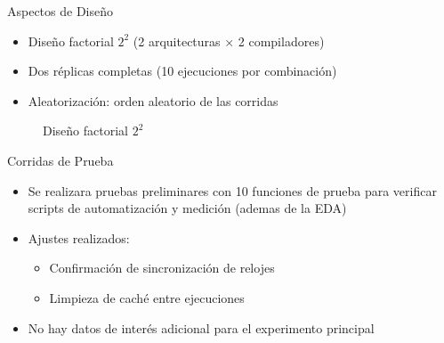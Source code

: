 \documentclass[aspectratio=169]{beamer}
\begin{document}
\begin{frame}{Aspectos de Diseño}
    \begin{itemize}
        \item Diseño factorial $2^2$ (2 arquitecturas × 2 compiladores)
        \item Dos réplicas completas (10 ejecuciones por combinación)
        \item Aleatorización: orden aleatorio de las corridas
    \end{itemize}
    
    \begin{figure}
        \centering
        \caption{Diseño factorial $2^2$}
    \end{figure}
\end{frame}

\begin{frame}{Corridas de Prueba}
    \begin{itemize}
        \item Se realizara pruebas preliminares con 10 funciones de prueba para verificar scripts de automatización y medición (ademas de la EDA)
        \item Ajustes realizados:
        \begin{itemize}
            \item Confirmación de sincronización de relojes
            \item Limpieza de caché entre ejecuciones
        \end{itemize}
        \item No hay datos de interés adicional para el experimento principal
    \end{itemize}
\end{frame}
\end{document}
